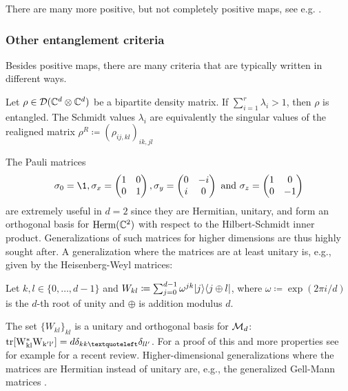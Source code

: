 There are many more positive, but not completely positive maps, see e.g. \cite{wolf2012quantum}.

\subsubsection{Other entanglement criteria}
Besides positive maps, there are many criteria that are typically written in different ways.
\begin{prop}
    Let $\rho \in \mathcal D(\mathbb{C}^d\otimes \mathbb{C}^d)$ be a bipartite density matrix. If $\sum_{i=1}^r \lambda_i >1$, then $\rho$ is entangled. The Schmidt values $\lambda_i$ are equivalently the singular values of the realigned matrix $\rho^R\coloneqq (\rho_{ij,kl})_{ik,jl}${}
\end{prop}

The Pauli matrices \cite{Pauli1927} 
\begin{align}
    \sigma_0 = \1, \sigma_x = \begin{pmatrix}
        1 & 0 \\
        0 & 1
    \end{pmatrix}, \sigma_y = \begin{pmatrix}
        0 & -i\\
        i & 0
    \end{pmatrix}\text{ and } \sigma_z = \begin{pmatrix}
        1 & 0 \\
        0 & -1
    \end{pmatrix}
\end{align}
are extremely useful in $d=2$ since they are Hermitian, unitary, and form an orthogonal basis for $\text{Herm}(\mathbb{C}^2)$ with respect to the Hilbert-Schmidt inner product. Generalizations of such matrices for higher dimensions are thus highly sought after. A generalization where the matrices are at least unitary is, e.g., given by the Heisenberg-Weyl matrices:
\begin{definition}
    Let $k,l \in \{0, \dots, d-1\}$ and $W_{kl}\coloneqq \sum_{j=0}^{d-1}\omega ^{jk}\lvert j\rangle\langle j\oplus l\rvert$, where $\omega\coloneqq \exp(2\pi i/d)$ is the $d$-th root of unity and $\oplus$ is addition modulus $d$.
\end{definition}\noindent
The set $\{W_{kl}\}_{kl}$ is a unitary and orthogonal basis for $\mathcal M_d$: $\trr{W_{kl}^*W_{k'l'}} = d \delta_{kk‘}\delta_{ll'}$. For a proof of this and more properties see for example \cite{hiesmayrBipartiteBoundEntanglement2025} for a recent review.  Higher-dimensional generalizations where the matrices are Hermitian instead of unitary are, e.g., the generalized Gell-Mann matrices \cite{Hioe1981}. 

